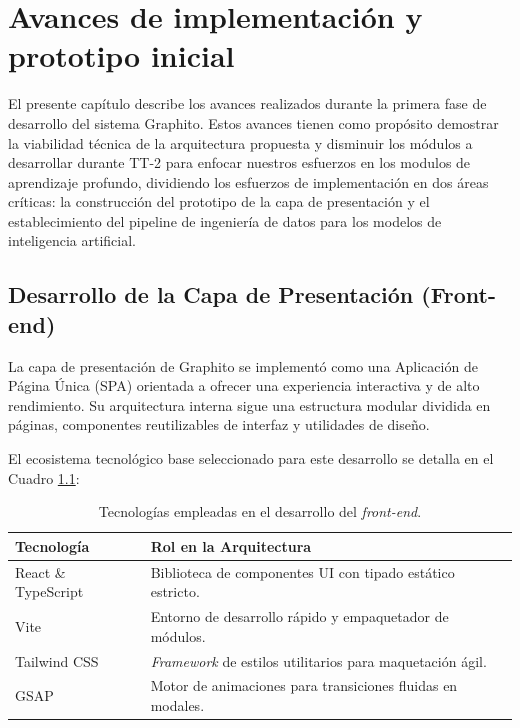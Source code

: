 \chapter{Avances de implementación y prototipo inicial}
El presente capítulo describe los avances realizados durante la primera fase de desarrollo del sistema Graphito. Estos avances tienen como propósito demostrar la viabilidad técnica de la arquitectura propuesta y disminuir los módulos a desarrollar durante TT-2 para enfocar nuestros esfuerzos en los modulos de aprendizaje profundo, dividiendo los esfuerzos de implementación en dos áreas críticas: la construcción del prototipo de la capa de presentación y el establecimiento del pipeline de ingeniería de datos para los modelos de inteligencia artificial.

\section{Desarrollo de la Capa de Presentación (Front-end)}

La capa de presentación de Graphito se implementó como una Aplicación de Página Única (SPA) orientada a ofrecer una experiencia interactiva y de alto rendimiento. Su arquitectura interna sigue una estructura modular dividida en páginas, componentes reutilizables de interfaz y utilidades de diseño.

El ecosistema tecnológico base seleccionado para este desarrollo se detalla en el Cuadro \ref{tab:tech-stack}:

\begin{table}[H]
    \centering
    \caption{Tecnologías empleadas en el desarrollo del \textit{front-end}.}
    \begin{tabular}{|l|l|}
        \hline
        \textbf{Tecnología} & \textbf{Rol en la Arquitectura} \\ \hline
        React \& TypeScript & Biblioteca de componentes UI con tipado estático estricto. \\ \hline
        Vite & Entorno de desarrollo rápido y empaquetador de módulos. \\ \hline
        Tailwind CSS & \textit{Framework} de estilos utilitarios para maquetación ágil. \\ \hline
        GSAP & Motor de animaciones para transiciones fluidas en modales. \\ \hline
    \end{tabular}
    \label{tab:tech-stack}
\end{table}

